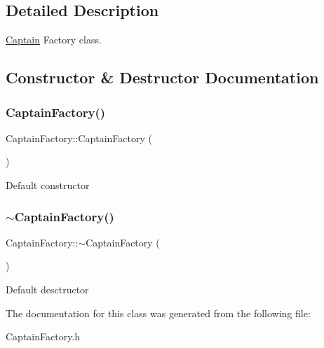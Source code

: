 \subsection{Detailed Description}
\hyperlink{classCaptain}{Captain} Factory class. 

\subsection{Constructor \& Destructor Documentation}
\mbox{\label{classCaptainFactory_a194bc3adbc4f09ca79df90d1aab30dc1}} 
\subsubsection{\texorpdfstring{Captain\+Factory()}{CaptainFactory()}}
{\footnotesize\ttfamily Captain\+Factory\+::\+Captain\+Factory (\begin{DoxyParamCaption}{ }\end{DoxyParamCaption})\hspace{0.3cm}{\ttfamily [inline]}}

Default constructor \mbox{\label{classCaptainFactory_a1ffe5cdefdefcb36f4c362990dd61080}} 
\subsubsection{\texorpdfstring{$\sim$\+Captain\+Factory()}{~CaptainFactory()}}
{\footnotesize\ttfamily Captain\+Factory\+::$\sim$\+Captain\+Factory (\begin{DoxyParamCaption}{ }\end{DoxyParamCaption})\hspace{0.3cm}{\ttfamily [inline]}}

Default desctructor 

The documentation for this class was generated from the following file\+:\begin{DoxyCompactItemize}
\item 
Captain\+Factory.\+h\end{DoxyCompactItemize}
